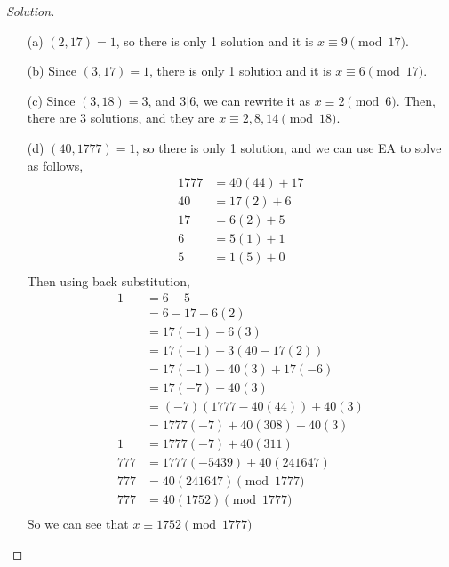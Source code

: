 \documentclass[11pt]{article}
\newenvironment{solution}
  {\renewcommand\qedsymbol{$~$}\begin{proof}[Solution]$ $\par\nobreak\ignorespaces}
  {\end{proof}}
\begin{document}
\begin{solution}
    \begin{itemize}
        \item [(a)] $(2,17)=1$, so there is only 1 solution and it is $x\equiv9\pmod{17}$.
        \item [(b)] Since $(3,17)=1$, there is only 1 solution and it is $x\equiv6\pmod{17}$.
        \item [(c)] Since $(3,18)=3$, and $3|6$, we can rewrite it as $x\equiv 2 \pmod{6}$. Then, there are 3 solutions, and they are $x\equiv 2, 8, 14 \pmod{18}$.
        \item [(d)] $(40,1777)=1$, so there is only 1 solution, and we can use EA to solve as follows,
              \begin{align*}
                  1777 & = 40(44)+17 \\
                  40   & = 17(2) + 6 \\
                  17   & = 6(2) + 5  \\
                  6    & = 5(1) + 1  \\
                  5    & = 1(5)+0    \\
              \end{align*}
              Then using back substitution,
              \begin{align*}
                  1   & = 6 - 5                      \\
                      & = 6 - 17+6(2)                \\
                      & = 17(-1) + 6(3)              \\
                      & = 17(-1) + 3(40-17(2))       \\
                      & = 17(-1) + 40(3) + 17(-6)    \\
                      & = 17(-7) + 40(3)             \\
                      & = (-7)(1777-40(44)) + 40(3)  \\
                      & = 1777(-7) + 40(308) + 40(3) \\
                  1   & = 1777(-7) + 40(311)         \\
                  777 & = 1777(-5439) +40(241647)    \\
                  777 & = 40(241647) \pmod{1777}     \\
                  777 & = 40(1752) \pmod{1777}       \\
              \end{align*}
              So we can see that $x\equiv 1752\pmod{1777}$
    \end{itemize}
\end{solution}
\end{document}
